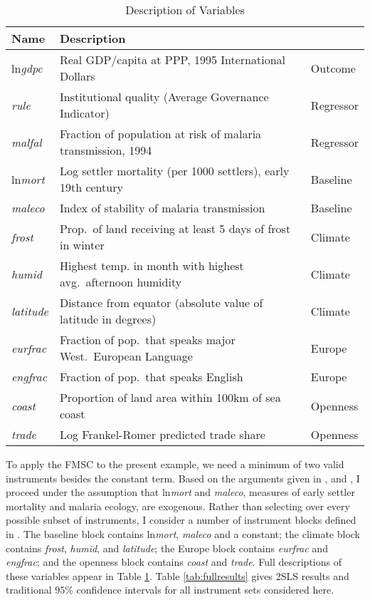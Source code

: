 \begin{table}[!tbp]
\caption{Description of Variables}
\small
\label{tab:desc}
\begin{center}
\begin{tabular}{lll}
\hline \hline
Name& Description &\\
\hline
ln\emph{gdpc}&Real GDP/capita at PPP, 1995 International Dollars &Outcome\\
\emph{rule}&Institutional quality (Average Governance Indicator)&Regressor\\
\emph{malfal}&Fraction of population at risk of malaria transmission, 1994&Regressor\\
ln\emph{mort}&Log settler mortality (per 1000 settlers), early 19th century&Baseline\\
\emph{maleco}&Index of stability of malaria transmission&Baseline\\
\emph{frost}&Prop.\ of land receiving at least 5 days of frost in winter&Climate\\
\emph{humid}&Highest temp. in month with highest avg.\ afternoon humidity&Climate\\
\emph{latitude}&Distance from equator (absolute value of latitude in degrees)&Climate \\
\emph{eurfrac}&Fraction of pop.\ that speaks major West.\ European Language&Europe \\
\emph{engfrac}&Fraction of pop.\ that speaks English&Europe\\
\emph{coast}&Proportion of land area within 100km of sea coast&Openness\\
\emph{trade}&Log Frankel-Romer predicted trade share&Openness\\
\hline
\end{tabular}
\end{center}
\end{table}

To apply the FMSC to the present example, we need a minimum of two valid instruments besides the constant term. Based on the arguments given in \cite{Acemoglu}, \cite{Carstensen2006} and \cite{Sachs}, I proceed under the assumption that ln\emph{mort} and \emph{maleco}, measures of early settler mortality and malaria ecology, are exogenous. Rather than selecting over every possible subset of instruments, I consider a number of instrument blocks defined in \cite{Carstensen2006}. The baseline block contains ln\emph{mort}, \emph{maleco} and a constant; the climate block contains \emph{frost}, \emph{humid}, and \emph{latitude}; the Europe block contains \emph{eurfrac} and \emph{engfrac}; and the openness block contains \emph{coast} and \emph{trade}. Full descriptions of these variables appear in Table \ref{tab:desc}. Table \ref{tab:fullresults} gives 2SLS results and traditional 95\% confidence intervals for all instrument sets considered here.

